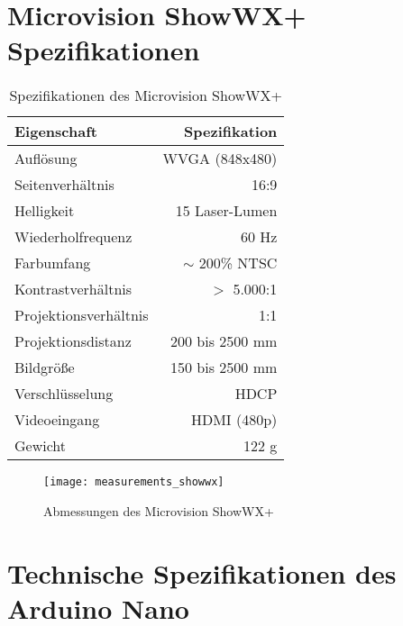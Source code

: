 \section{Microvision ShowWX+ Spezifikationen}
\label{app:projector}

\begin{table}[!ht]
\caption{Spezifikationen des Microvision ShowWX+}
\begin{center}
\vspace{-3mm}
\begin{tabular}{|l|r|}
\hline
\rowcolor{lightgray} Eigenschaft & Spezifikation \\
\hline
Auflösung 	& WVGA (848x480) \\
\hline
Seitenverhältnis & 16:9 \\
\hline
Helligkeit 	& 15 Laser-Lumen \\
\hline
Wiederholfrequenz & 60 Hz \\
\hline
Farbumfang 	& $\sim$ 200\% NTSC \\
\hline
Kontrastverhältnis 	& $>$ 5.000:1 \\
\hline
Projektionsverhältnis 	& 1:1 \\
\hline
Projektionsdistanz 	& 200 bis 2500 mm \\
\hline
Bildgröße 	& 150 bis 2500 mm \\
\hline
Verschlüsselung 	& HDCP \\
\hline
Videoeingang & HDMI (480p) \\
\hline
Gewicht 	& 122 g \\
\hline
\end{tabular}
\end{center}
\label{tab:landmarks_f1}
\end{table}

\begin{figure}[hb]
\begin{center}
		\texttt{[image: measurements\_showwx]}
\end{center}
\vspace{-5mm}
\caption{Abmessungen des Microvision ShowWX+}
\label{fig.specs_proj}
\end{figure}

\clearpage{}

\section{Technische Spezifikationen des Arduino Nano}
\label{app:arduino}

